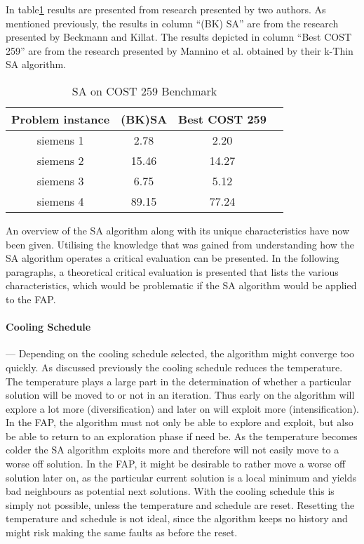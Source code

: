 In table\ref{tab:SA} results are presented from research presented by two authors. As mentioned previously, the results in column ``(BK) \gls{SA}'' are from the research presented by Beckmann and Killat\cite{BeKi99a}. The results depicted in column ``Best \gls{COST} 259'' are from the research presented by Mannino et al.\cite{MaOrRi02} obtained by their k-Thin \gls{SA} algorithm.
\begin{table}[H]
\centering
	\begin{tabular}{| c | c | c | c |}
	\hline
    Problem instance & (BK)\gls{SA} & Best \gls{COST} 259 \\ \hline
	siemens 1 & 2.78 & 2.20\\ \hline
	siemens 2 & 15.46 & 14.27\\ \hline
	siemens 3 & 6.75 & 5.12\\ \hline
	siemens 4 & 89.15 & 77.24\\ \hline
	\end{tabular}
\caption{SA on \gls{COST} 259 Benchmark}
\label{tab:SA}
\end{table}


An overview of the \gls{SA} algorithm along with its unique characteristics have now been given. Utilising the knowledge that was gained from understanding how the \gls{SA} algorithm operates a critical evaluation can be presented. In the following paragraphs, a theoretical critical evaluation is presented that lists the various characteristics, which would be problematic if the \gls{SA} algorithm would be applied to the \gls{FAP}.

\paragraph{Cooling Schedule}
--- Depending on the cooling schedule selected, the algorithm might converge too quickly. As discussed previously the cooling schedule reduces the temperature. The temperature plays a large part in the determination of whether a particular solution will be moved to or not in an iteration. Thus early on the algorithm will explore a lot more (diversification) and later on will exploit more (intensification). In the \gls{FAP}, the algorithm must not only be able to explore and exploit, but also be able to return to an exploration phase if need be.
As the temperature becomes colder the \gls{SA} algorithm exploits more and therefore will not easily move to a worse off solution. In the \gls{FAP}, it might be desirable to rather move a worse off solution later on, as the particular current solution is a local minimum and yields bad neighbours as potential next solutions. With the cooling schedule this is simply not possible, unless the temperature and schedule are reset. Resetting the temperature and schedule is not ideal, since the algorithm keeps no history and might risk making the same faults as before the reset.

